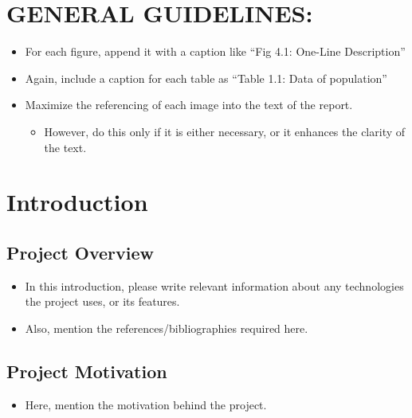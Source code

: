 \documentclass[
  12pt,
  a4paper,
  option1,
  option2]{report}
\author{}
\date{}
\providecommand{\tightlist}{%
  \setlength{\itemsep}{0pt}\setlength{\parskip}{0pt}}
\begin{document}

\renewcommand*\contentsname{Table of Contents}
{
\hypersetup{linkcolor=blue}
\setcounter{tocdepth}{2}
\tableofcontents
}
\listoffigures
\listoftables
{}
\clearpage
{}
\chapter{GENERAL GUIDELINES:}\label{general-guidelines}

\begin{itemize}
\tightlist
\item
  For each figure, append it with a caption like ``Fig 4.1: One-Line
  Description''
\item
  Again, include a caption for each table as ``Table 1.1: Data of
  population''
\item
  Maximize the referencing of each image into the text of the report.

  \begin{itemize}
  \tightlist
  \item
    However, do this only if it is either necessary, or it enhances the
    clarity of the text.
  \end{itemize}
\end{itemize}

\chapter{Introduction}\label{sec:Intro}

\section{Project Overview}\label{sec:IntroOverview}

\begin{itemize}
\item
  In this introduction, please write relevant information about any
  technologies the project uses, or its features.
\item
  Also, mention the references/bibliographies required here.
\end{itemize}

\section{Project Motivation}\label{sec:IntroMotive}

\begin{itemize}
\tightlist
\item
  Here, mention the motivation behind the project.
\end{itemize}
\end{document}
